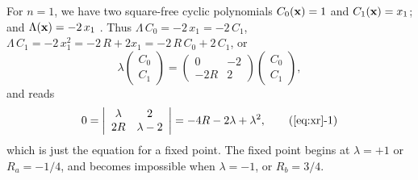\documentclass{ws-ijbc}
\begin{document}
For $n = 1$, we have two square-free cyclic polynomials
  $C_0(\mathbf{x}) = 1$ and $C_1(\mathbf{x}) = x_1$;
  and $\Lambda(\mathbf{x}) = -2 \, x_1$
.
Thus $\Lambda \, C_0 = -2 \, x_1 = -2 \, C_1$,
$\Lambda \, C_1 = -2 \, x_1^2 = -2 \, R + 2 x_1 = -2 \, R \, C_0 + 2 \, C_1$,
or
\[
  \lambda
  \left( \begin{array}{c}
  C_0 \\
  C_1
  \end{array} \right)
  =
  \left( \begin{array}{cc}
  0     & -2 \\
  -2R   &  2
  \end{array}\right)
  \left( \begin{array}{c}
  C_0 \\
  C_1
  \end{array} \right),
\]
and  reads
\begin{equation}
0=  \left| \begin{array}{cc}
  \lambda     & 2          \\
  2 R         & \lambda - 2
  \end{array} \right| = -4R - 2\lambda + \lambda^2,
  \tag{\ref{eq:xr}-1}
\label{eq:xr1}
\end{equation}
which is just the equation for a fixed point.
The fixed point begins at $\lambda = +1$ or $R_a = -1/4$,
  and becomes impossible when $\lambda = -1$, or $R_b = 3/4$.
\end{document}
